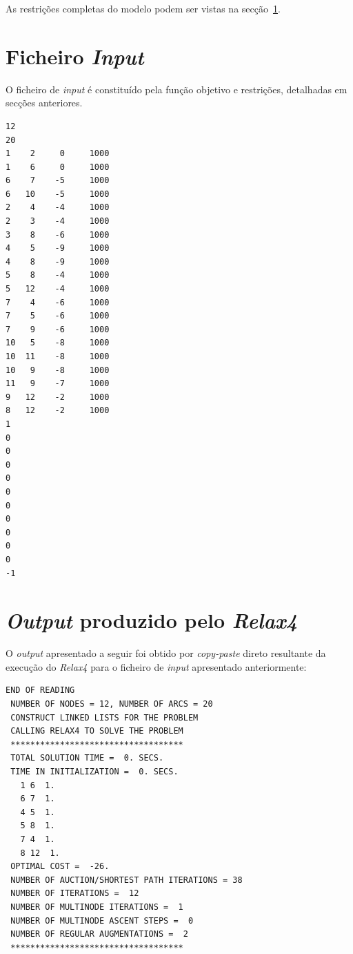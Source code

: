 As restrições completas do modelo podem ser vistas na
secção~\ref{p1:sec:fichin}.


\section{Ficheiro \emph{Input}}
\label{p1:sec:fichin}
O ficheiro de \emph{input} é constituído pela função objetivo e restrições, detalhadas
em secções anteriores.

\begin{verbatim}
12                   
20                   
1    2     0     1000 
1    6     0     1000 
6    7    -5     1000 
6   10    -5     1000 
2    4    -4     1000 
2    3    -4     1000 
3    8    -6     1000 
4    5    -9     1000 
4    8    -9     1000 
5    8    -4     1000 
5   12    -4     1000 
7    4    -6     1000 
7    5    -6     1000 
7    9    -6     1000 
10   5    -8     1000 
10  11    -8     1000 
10   9    -8     1000 
11   9    -7     1000 
9   12    -2     1000 
8   12    -2     1000 
1                   
0                    
0                    
0                    
0                    
0                    
0                    
0                    
0                    
0                    
0                    
-1                    

\end{verbatim}

\newpage

\section{\emph{Output} produzido pelo \emph{Relax4}}

O \emph{output} apresentado a seguir foi obtido por \emph{copy-paste} direto
resultante da execução do \emph{Relax4} para
o ficheiro de \emph{input} apresentado anteriormente:

\begin{verbatim}
END OF READING
 NUMBER OF NODES = 12, NUMBER OF ARCS = 20
 CONSTRUCT LINKED LISTS FOR THE PROBLEM
 CALLING RELAX4 TO SOLVE THE PROBLEM
 ***********************************
 TOTAL SOLUTION TIME =  0. SECS.
 TIME IN INITIALIZATION =  0. SECS.
   1 6  1.
   6 7  1.
   4 5  1.
   5 8  1.
   7 4  1.
   8 12  1.
 OPTIMAL COST =  -26.
 NUMBER OF AUCTION/SHORTEST PATH ITERATIONS = 38
 NUMBER OF ITERATIONS =  12
 NUMBER OF MULTINODE ITERATIONS =  1
 NUMBER OF MULTINODE ASCENT STEPS =  0
 NUMBER OF REGULAR AUGMENTATIONS =  2
 ***********************************
\end{verbatim}

